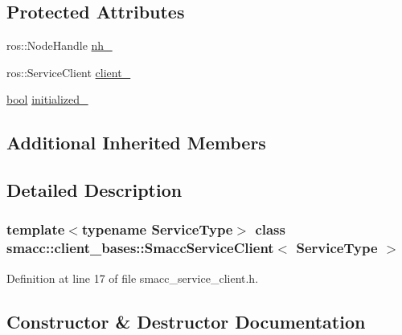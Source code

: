 \subsection*{Protected Attributes}
\begin{DoxyCompactItemize}
\item 
ros\+::\+Node\+Handle \hyperlink{classsmacc_1_1client__bases_1_1SmaccServiceClient_afb62982383b8269c7962cd1588537489}{nh\+\_\+}
\item 
ros\+::\+Service\+Client \hyperlink{classsmacc_1_1client__bases_1_1SmaccServiceClient_a632093eb6bc8b058dec492b21c8536f9}{client\+\_\+}
\item 
\hyperlink{classbool}{bool} \hyperlink{classsmacc_1_1client__bases_1_1SmaccServiceClient_ad36816c62fc14380a6d0782a2592a5b4}{initialized\+\_\+}
\end{DoxyCompactItemize}
\subsection*{Additional Inherited Members}


\subsection{Detailed Description}
\subsubsection*{template$<$typename Service\+Type$>$\newline
class smacc\+::client\+\_\+bases\+::\+Smacc\+Service\+Client$<$ Service\+Type $>$}



Definition at line 17 of file smacc\+\_\+service\+\_\+client.\+h.



\subsection{Constructor \& Destructor Documentation}
\mbox{\label{classsmacc_1_1client__bases_1_1SmaccServiceClient_ab041a903fa40cb5df251f0cd437604cc}} 
